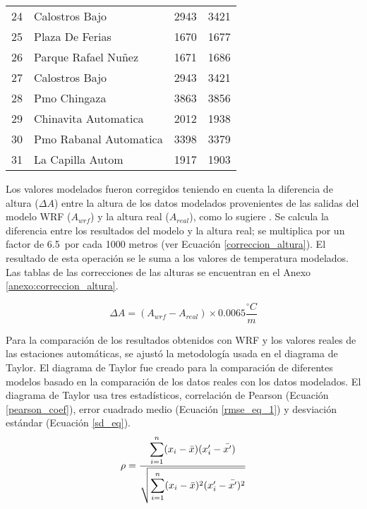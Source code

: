 \begin{table}[H]
\begin{tabular}{llrr}
24 &           Calostros Bajo  &      2943 &     3421 \\
25 &          Plaza De Ferias  &      1670 &     1677 \\
26 &      Parque Rafael Nuñez  &      1671 &     1686 \\
27 &         Calostros Bajo    &      2943 &     3421 \\
28 &             Pmo Chingaza  &      3863 &     3856 \\
29 &     Chinavita Automatica  &      2012 &     1938 \\
30 &  Pmo Rabanal Automatica   &      3398 &     3379 \\
31 &         La Capilla Autom  &      1917 &     1903 \\
\bottomrule
\end{tabular}
\end{table}



Los valores modelados fueron corregidos teniendo en cuenta la diferencia de altura ($\Delta A$) entre la altura de los datos modelados provenientes de  las salidas del modelo WRF ($A_{wrf}$) y la altura real ($A_{real}$), como lo sugiere \citet{Pabon-Caicedo2001}. Se calcula la diferencia entre los resultados del modelo y la altura real; se multiplica por un factor de 6.5\celc\ por cada 1000 metros (ver Ecuación \ref{correccion_altura}). El resultado de esta operación se le suma a los valores de temperatura modelados. Las tablas de las correcciones de las alturas se encuentran en el Anexo \ref{anexo:correccion_altura}.

\begin{equation} \label{correccion_altura}
\Delta A = (A_{wrf} - A_{real}) \times 0.0065 \frac{^{\circ}C}{m}
\end{equation}
 

Para la comparación de los resultados obtenidos con WRF y los valores reales de las estaciones automáticas, se ajustó la metodología usada en el diagrama de Taylor. El diagrama de Taylor \citep{taylor2001summarizing} fue creado para la comparación de diferentes modelos basado en la comparación de los datos reales con los datos modelados. El diagrama de Taylor usa tres estadísticos, correlación de Pearson (Ecuación \ref{pearson_coef}), error cuadrado medio (Ecuación \ref{rmse_eq_1}) y desviación estándar (Ecuación \ref{sd_eq}).\\

\begin{equation}\label{pearson_coef}
\rho =\frac{\mathlarger{\sum_{i=1}^n} (x_i-\bar{x}) (x'_i-\bar{x'})}{\mathlarger{\sqrt{\sum_{i=1}^n (x_i-\bar{x})^2 (x'_i-\bar{x'})^2}}}
\end{equation}

